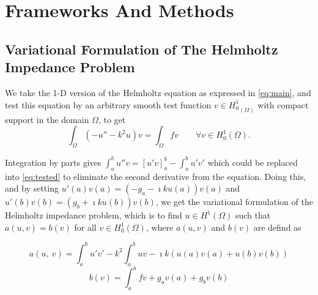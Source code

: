 \section{Frameworks And Methods}\label{sec:frameworks}

\subsection{Variational Formulation of The Helmholtz Impedance Problem}
\label{sec:variational}

We take the 1-D version of the Helmholtz equation as expressed in \autoref{eq:main}, and test this equation by an arbitrary smooth test function $v \in {H_{0}^{1} }_{(\Omega)}$ with compact support in the domain $\Omega$, to get
\begin{equation}
    \label{eq:tested}
    \int_{\Omega}{{(-u'' - k^2u)}v} = \int_{\Omega}{fv} \qquad \forall v \in {H_{0}^{1}(\Omega)}.
\end{equation}

Integration by parts gives $\int_{a}^{b}{u''v} = [u'v]_{a}^{b} - \int_{a}^{b}{u'v'}$ which could be replaced into \autoref{eq:tested} to eliminate the second derivative from the equation. Doing this, and by setting $u'(a)v(a) = (-g_a-\imath ku(a))v(a)$ and $u'(b)v(b) = (g_b+\imath ku(b))v(b)$, we get the variational formulation of the Helmholtz impedance problem, which is to find $u \in {H^{1}(\Omega)}$ such that $a(u,v) = b(v)$ for all $v \in {H_{0}^{1}(\Omega)}$, where $a(u,v)$ and $b(v)$ are defind as

\begin{equation}
    \label{eq:varlhs}
    a(u,\:v) = \int_{a}^{b}{u'v'} - k^2 \int_{a}^{b}{uv} - \imath k (u(a)v(a) + u(b)v(b))
\end{equation}
\begin{equation}
    \label{eq:varrhs}
    b(v) = \int_{a}^{b}{fv} + g_a v(a) + g_b v(b)
\end{equation}


